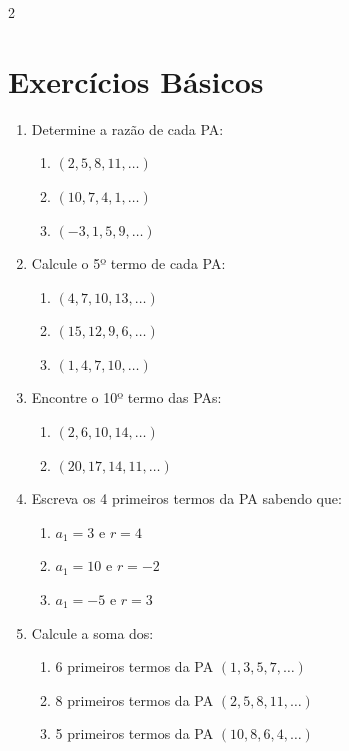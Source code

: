 \documentclass[11pt]{article}
\begin{document}
\begin{multicols}{2}

\section*{Exercícios Básicos}

\begin{enumerate}[leftmargin=*]

\item Determine a razão de cada PA: 
\begin{enumerate}[label=\alph*)]
\item $(2, 5, 8, 11, \ldots)$
\item $(10, 7, 4, 1, \ldots)$
\item $(-3, 1, 5, 9, \ldots)$
\end{enumerate}

\item Calcule o 5º termo de cada PA:
\begin{enumerate}[label=\alph*)]
\item $(4, 7, 10, 13, \ldots)$
\item $(15, 12, 9, 6, \ldots)$
\item $(1, 4, 7, 10, \ldots)$
\end{enumerate}

\item Encontre o 10º termo das PAs:
\begin{enumerate}[label=\alph*)]
\item $(2, 6, 10, 14, \ldots)$
\item $(20, 17, 14, 11, \ldots)$
\end{enumerate}

\item Escreva os 4 primeiros termos da PA sabendo que:
\begin{enumerate}[label=\alph*)]
\item $a_1 = 3$ e $r = 4$
\item $a_1 = 10$ e $r = -2$
\item $a_1 = -5$ e $r = 3$
\end{enumerate}

\item Calcule a soma dos:
\begin{enumerate}[label=\alph*)]
\item 6 primeiros termos da PA $(1, 3, 5, 7, \ldots)$
\item 8 primeiros termos da PA $(2, 5, 8, 11, \ldots)$
\item 5 primeiros termos da PA $(10, 8, 6, 4, \ldots)$
\end{enumerate}


\end{enumerate}
\end{multicols}
\end{document}

